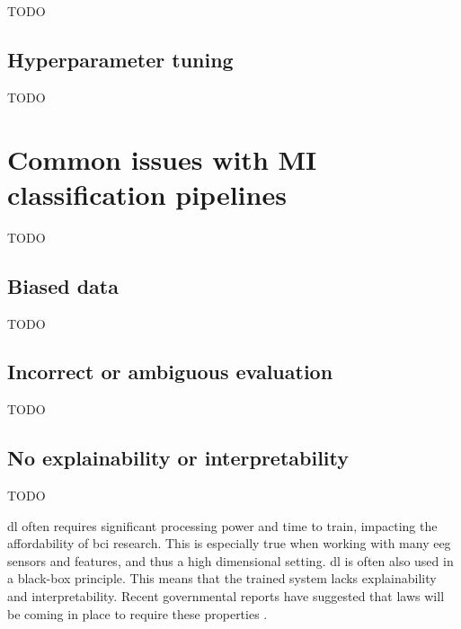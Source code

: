 TODO



\subsection{Hyperparameter tuning}
\label{subsec:processing_signals_evaluating_and_using_hyperparameter_tuning}

TODO


\section{Common issues with MI classification pipelines}
\label{sec:processing_signals_common_issues}

TODO


\subsection{Biased data}
\label{subsec:processing_signals_common_issues_bias}

TODO


\subsection{Incorrect or ambiguous evaluation}
\label{subsec:processing_signals_common_issues_generalisation}

TODO


\subsection{No explainability or interpretability}
\label{subsec:processing_signals_common_issues_exaplainable}

TODO

\Gls{dl} often requires significant processing power and time to train, impacting the affordability of \gls{bci} research.
This is especially true when working with many \gls{eeg} sensors and features, and thus a high dimensional setting. 
\Gls{dl} is often also used in a black-box principle.
This means that the trained system lacks explainability and interpretability.
Recent governmental reports have suggested that laws will be coming in place to require these properties \citep{eu_ai_blackbox_report, explainable_ai_policy}.

